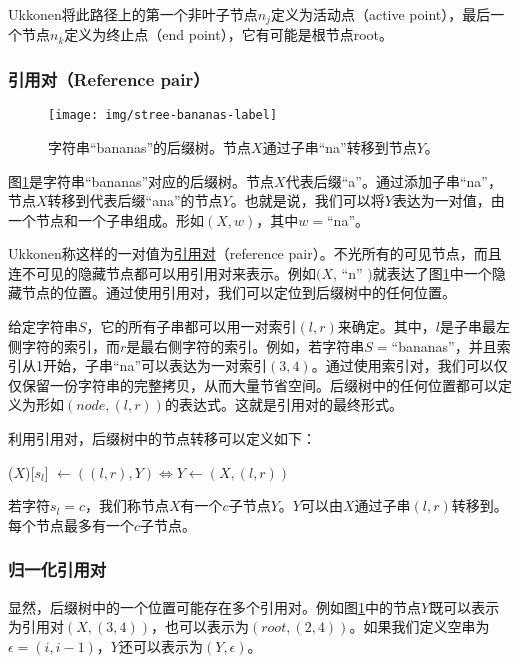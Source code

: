 \documentclass{ctexart}
\begin{document}
Ukkonen将此路径上的第一个非叶子节点$n_j$定义为活动点（active point），最后一个节点$n_k$定义为终止点（end point），它有可能是根节点root。

\subsubsection{引用对（Reference pair）}

\begin{figure}[htbp]
  \centering
  \texttt{[image: img/stree-bananas-label]}
  \caption{字符串“bananas”的后缀树。节点$X$通过子串“na”转移到节点$Y$。}
  \label{fig:stree-bananas-label}
\end{figure}

图\ref{fig:stree-bananas-label}是字符串“bananas”对应的后缀树。节点$X$代表后缀“a”。通过添加子串“na”，节点$X$转移到代表后缀“ana”的节点$Y$。也就是说，我们可以将$Y$表达为一对值，由一个节点和一个子串组成。形如$(X, w)$，其中$w=$“na”。

Ukkonen称这样的一对值为\underline{引用对}（reference pair）。不光所有的可见节点，而且连不可见的隐藏节点都可以用引用对来表示。例如$(X$, “n” $)$就表达了图\ref{fig:stree-bananas-label}中一个隐藏节点的位置。通过使用引用对，我们可以定位到后缀树中的任何位置。

给定字符串$S$，它的所有子串都可以用一对索引$(l, r)$来确定。其中，$l$是子串最左侧字符的索引，而$r$是最右侧字符的索引。例如，若字符串$S=$“bananas”，并且索引从1开始，子串“na”可以表达为一对索引$(3, 4)$。通过使用索引对，我们可以仅仅保留一份字符串的完整拷贝，从而大量节省空间。后缀树中的任何位置都可以定义为形如$(node, (l, r))$的表达式。这就是引用对的最终形式。

利用引用对，后缀树中的节点转移可以定义如下：

($X$)[$s_l$] $\gets ((l, r), Y) \iff Y \gets (X, (l, r))$

若字符$s_l=c$，我们称节点$X$有一个$c$子节点$Y$。$Y$可以由$X$通过子串$(l, r)$转移到。每个节点最多有一个$c$子节点。

\subsubsection{归一化引用对}

显然，后缀树中的一个位置可能存在多个引用对。例如图\ref{fig:stree-bananas-label}中的节点$Y$既可以表示为引用对$(X, (3, 4))$，也可以表示为$(root, (2, 4))$。如果我们定义空串为$\epsilon=(i, i-1)$，$Y$还可以表示为$(Y, \epsilon)$。
\end{document}
